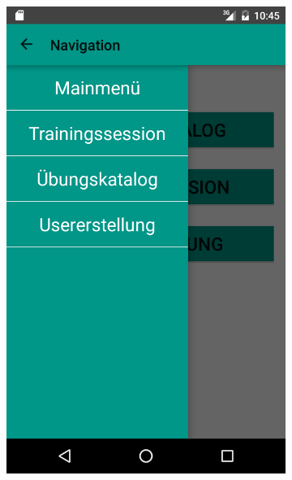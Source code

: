 \documentclass[FIPLY_base.tex]{subfiles}
\begin{document}
\begin{figure}
	\begin{subfigure}[b]{0.3\textwidth}
	\includegraphics[scale=0.20]{img/NavigationDrawer}
	\end{subfigure}
	\hfil
	\begin{subfigure}[b]{0.3\textwidth}

\end{subfigure}
\end{figure}
\end{document}

